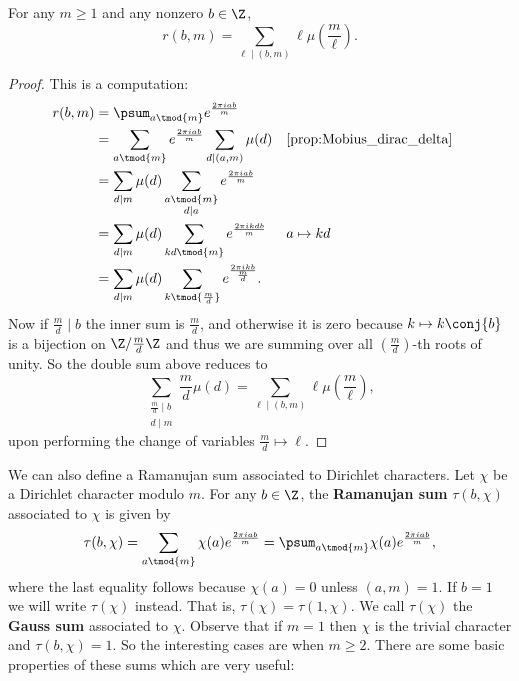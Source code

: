       \begin{proposition}\label{prop:Ramanujan_sum_evaluation}
        For any $m \ge 1$ and any nonzero $b \in \Z$,
        \[
          r(b,m) = \sum_{\ell \mid (b,m)}\ell\mu\left(\frac{m}{\ell}\right).
        \]
      \end{proposition}
      \begin{proof}
        This is a computation:
        \begin{align*}
          r(b,m) &= \psum_{a \tmod{m}}e^{\frac{2\pi iab}{m}} \\
          &= \sum_{a \tmod{m}}e^{\frac{2\pi iab}{m}}\sum_{d \mid (a,m)}\mu(d) && \text{\cref{prop:Mobius_dirac_delta}} \\
          &= \sum_{d \mid m}\mu(d)\sum_{\substack{a \tmod{m} \\ d \mid a}}e^{\frac{2\pi iab}{m}} \\
          &= \sum_{d \mid m}\mu(d)\sum_{kd \tmod{m}}e^{\frac{2\pi ikdb}{m}} && \text{$a \mapsto kd$} \\
          &= \sum_{d \mid m}\mu(d)\sum_{k \tmod{\frac{m}{d}}}e^{\frac{2\pi ik b}{\frac{m}{d}}}.
        \end{align*}
        Now if $\frac{m}{d} \mid b$ the inner sum is $\frac{m}{d}$, and otherwise it is zero because $k \mapsto k\conj{b}$ is a bijection on $\Z/\frac{m}{d}\Z$ and thus we are summing over all $\left(\frac{m}{d}\right)$-th roots of unity. So the double sum above reduces to
        \[
          \sum_{\substack{\frac{m}{d} \mid b \\ d \mid m}}\frac{m}{d}\mu(d) = \sum_{\ell \mid (b,m)}\ell\mu\left(\frac{m}{\ell}\right),
        \]
        upon performing the change of variables $\frac{m}{d} \mapsto \ell$.
      \end{proof}
      We can also define a Ramanujan sum associated to Dirichlet characters. Let $\chi$ be a Dirichlet character modulo $m$. For any $b \in \Z$, the \textbf{Ramanujan sum} $\tau(b,\chi)$ associated to $\chi$ is given by
      \[
        \tau(b,\chi) = \sum_{a \tmod{m}}\chi(a)e^{\frac{2\pi iab}{m}} = \psum_{a \tmod{m}}\chi(a)e^{\frac{2\pi iab}{m}},
      \]
      where the last equality follows because $\chi(a) = 0$ unless $(a,m) = 1$. If $b = 1$ we will write $\tau(\chi)$ instead. That is, $\tau(\chi) = \tau(1,\chi)$. We call $\tau(\chi)$ the \textbf{Gauss sum} associated to $\chi$. Observe that if $m = 1$ then $\chi$ is the trivial character and $\tau(b,\chi) = 1$. So the interesting cases are when $m \ge 2$. There are some basic properties of these sums which are very useful:

